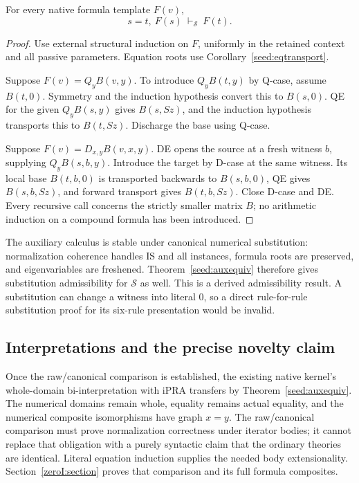 \begin{theorem}\label{seed:fulltransport}
For every native formula template $F(v)$,
\[
 s=t,\ F(s)\ \vdash_{\mathcal S}\ F(t).
\]
\end{theorem}
\begin{proof}
Use external structural induction on $F$, uniformly in the retained
context and all passive parameters. Equation roots use
Corollary~\ref{seed:eqtransport}.

Suppose $F(v)=Q_yB(v,y)$. To introduce $Q_yB(t,y)$ by Q-case,
assume $B(t,0)$. Symmetry and the induction hypothesis convert this
to $B(s,0)$. QE for the given $Q_yB(s,y)$ gives $B(s,Sz)$,
and the induction hypothesis transports this to $B(t,Sz)$.
Discharge the base using Q-case.

Suppose $F(v)=D_{x,y}B(v,x,y)$. DE opens the source at a fresh
witness $b$, supplying $Q_yB(s,b,y)$. Introduce the target by
D-case at the same witness. Its local base $B(t,b,0)$ is transported
backwards to $B(s,b,0)$, QE gives $B(s,b,Sz)$, and forward transport
gives $B(t,b,Sz)$. Close D-case and DE. Every recursive call concerns
the strictly smaller matrix $B$; no arithmetic induction on a compound
formula has been introduced.
\end{proof}

The auxiliary calculus is stable under canonical numerical substitution:
normalization coherence handles IS and all instances, formula roots are
preserved, and eigenvariables are freshened. Theorem~\ref{seed:auxequiv}
therefore gives substitution admissibility for $\mathcal S$ as well.
This is a derived admissibility result. A substitution can change a
witness into literal $0$, so a direct rule-for-rule substitution proof
for its six-rule presentation would be invalid.

\subsection{Interpretations and the precise novelty claim}

Once the raw/canonical comparison is established, the existing native
kernel's whole-domain bi-interpretation with iPRA transfers by
Theorem~\ref{seed:auxequiv}. The numerical domains remain whole,
equality remains actual equality, and the numerical composite
isomorphisms have graph $x=y$. The raw/canonical comparison must prove
normalization correctness under iterator bodies; it cannot replace that
obligation with a purely syntactic claim that the ordinary theories are
identical. Literal equation induction supplies the needed body
extensionality. Section~\ref{zeroI:section} proves that comparison and its full formula composites.

